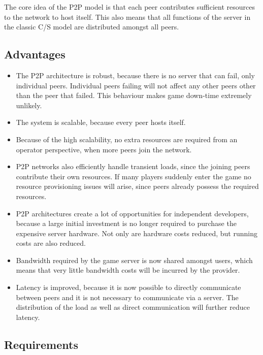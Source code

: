 The core idea of the P2P model is that each peer contributes sufficient resources to the network to host itself. This also means that all functions
of the server in the classic C/S model are distributed amongst all peers.

\subsection{Advantages}
\label{p2p_mmve_advantages}

\begin{itemize}
\item The P2P architecture is robust, because there is no server that can fail, only individual peers. Individual peers failing will not affect any other peers
other than the peer that failed. This behaviour makes game down-time extremely unlikely.

\item The system is scalable, because every peer hosts itself.

\item Because of the high scalability, no extra resources are required from an operator perspective, when more peers join the network.

\item P2P networks also efficiently handle transient loads, since the joining peers contribute their own resources. If many players suddenly enter the
game no resource provisioning issues will arise, since peers already possess the required resources.

\item P2P architectures create a lot of opportunities for independent developers, because a large initial investment is no longer required to purchase
the expensive server hardware. Not only are hardware costs reduced, but running costs are also reduced.

\item Bandwidth required by the game server is now shared amongst users, which means that very little bandwidth costs will be incurred by the provider.

\item Latency is improved, because it is now possible to directly communicate between peers and it is not necessary to communicate via a server.
The distribution of the load as well as direct communication will further reduce latency.
\end{itemize}

\subsection{Requirements}

